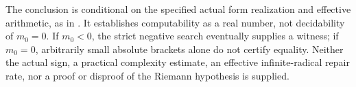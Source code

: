 The conclusion is conditional on the specified actual form realization and
effective arithmetic, as in \cite{vfourComputable}.  It establishes
computability as a real number, not decidability of $m_0=0$.  If $m_0<0$, the
strict negative search eventually supplies a witness; if $m_0=0$, arbitrarily
small absolute brackets alone do not certify equality.  Neither the actual
sign, a practical complexity estimate, an effective infinite-radical repair
rate, nor a proof or disproof of the Riemann hypothesis is supplied.
